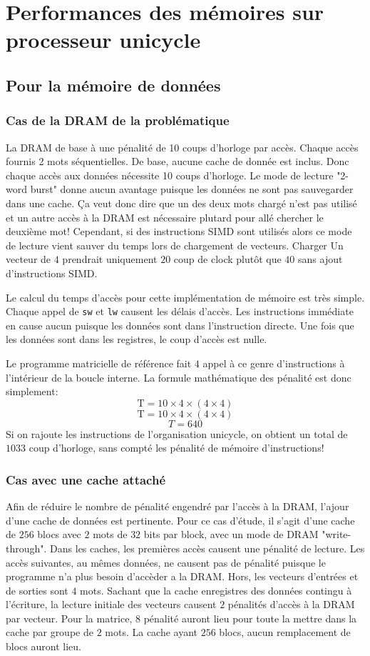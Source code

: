 \documentclass[a11paper]{article}
\begin{document}
\section{Performances des mémoires sur processeur unicycle}
\subsection{Pour la mémoire de données}
\subsubsection{Cas de la DRAM de la problématique}
La DRAM de base à une pénalité de 10 coups d'horloge par accès. Chaque accès fournis 2 mots séquentielles. De base, aucune cache de donnée est inclus. Donc chaque accès aux données
nécessite 10 coups d'horloge. Le mode de lecture "2-word burst" donne aucun avantage puisque les données ne sont pas sauvegarder dans une cache. Ça veut donc dire que un des deux
mots chargé n'est pas utilisé et un autre accès à la DRAM est nécessaire plutard pour allé chercher le deuxième mot! Cependant, si des instructions SIMD sont utilisés alors ce mode
de lecture vient sauver du temps lors de chargement de vecteurs. Charger Un vecteur de $4$ prendrait uniquement $20$ coup de clock plutôt que $40$ sans ajout d'instructions SIMD.

Le calcul du temps d'accès pour cette implémentation de mémoire est très simple. Chaque appel de \verb|sw| et \verb|lw| causent les délais d'accès. Les instructions immédiate en
cause aucun puisque les données sont dans l'instruction directe. Une fois que les données sont dans les registres, le coup d'accès est nulle.

Le programme matricielle de référence fait $4$ appel à ce genre d'instructions à l'intérieur de la boucle interne. La formule mathématique des pénalité est donc simplement:
$$
\text{T} = 10\times4\times(4\times4)
$$
$$
\text{T} = 10\times4\times(4\times4)
$$
$$
T=640
$$
Si on rajoute les instructions de l'organisation unicycle, on obtient un total de $1033$ coup d'horloge, sans compté les pénalité de mémoire d'instructions!

\subsubsection{Cas avec une cache attaché}
Afin de réduire le nombre de pénalité engendré par l'accès à la DRAM, l'ajour d'une cache de données est pertinente. Pour ce cas d'étude, il s'agit d'une cache de $256$ blocs avec
$2$ mots de $32$ bits par block, avec un mode de DRAM "write-through". Dans les caches, les premières accès causent une pénalité de lecture. Les accès suivantes, au mêmes données,
ne causent pas de pénalité puisque le programme n'a plus besoin d'accèder a la DRAM. Hors, les vecteurs d'entrées et de sorties sont $4$ mots. Sachant que la cache enregistres des 
données contingu à l'écriture, la lecture initiale des vecteurs causent $2$ pénalités d'accès à la DRAM par vecteur. Pour la matrice, $8$ pénalité auront lieu pour toute la mettre
dans la cache par groupe de $2$ mots. La cache ayant $256$ blocs, aucun remplacement de blocs auront lieu.
\end{document}
